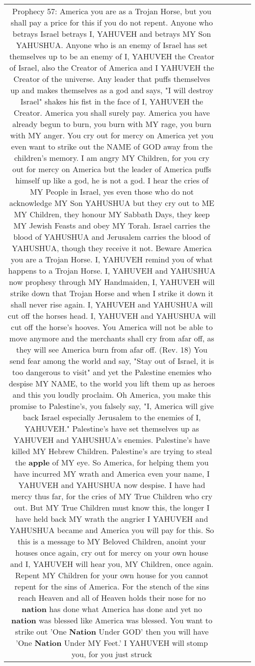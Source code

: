 \documentclass[11pt]{article}
\newlength\mylength
\begin{document}
\begin{center}
\begin{longtable}{|C{.65\mylength}|C{.30\mylength}|C{.12\mylength}|C{.12\mylength}|C{.12\mylength}|}
  \small Prophecy 57: America you are as a Trojan Horse, but you shall pay a price for this if you do not repent. Anyone who betrays Israel betrays I, YAHUVEH and betrays MY Son YAHUSHUA. Anyone who is an enemy of Israel has set themselves up to be an enemy of I, YAHUVEH the Creator of Israel, also the Creator of America and I YAHUVEH the Creator of the universe.  Any leader that puffs themselves up and makes themselves as a god and says, "I will destroy Israel" shakes his fist in the face of I, YAHUVEH the Creator. America you shall surely pay. America you have already begun to burn, you burn with MY rage, you burn with MY anger. You cry out for mercy on America yet you even want to strike out the NAME of GOD away from the children's memory. I am angry MY Children, for you cry out for mercy on America but the leader of America puffs himself up like a god, he is not a god. I hear the cries of MY People in Israel, yes even those who do not acknowledge MY Son YAHUSHUA but they cry out to ME MY Children, they honour MY Sabbath Days, they keep MY Jewish Feasts and obey MY Torah. Israel carries the blood of YAHUSHUA and Jerusalem carries the blood of YAHUSHUA, though they receive it not. Beware America you are a Trojan Horse. I, YAHUVEH remind you of what happens to a Trojan Horse. I, YAHUVEH and YAHUSHUA now prophesy through MY Handmaiden, I, YAHUVEH will strike down that Trojan Horse and when I strike it down it shall never rise again. I, YAHUVEH and YAHUSHUA will cut off the horses head. I, YAHUVEH and YAHUSHUA will cut off the horse's hooves. You America will not be able to move anymore and the merchants shall cry from afar off, as they will see America burn from afar off. (Rev. 18) You send fear among the world and say, "Stay out of Israel, it is too dangerous to visit" and yet the Palestine enemies who despise MY NAME, to the world you lift them up as heroes and this you loudly proclaim. Oh America, you make this promise to Palestine's, you falsely say, "I, America will give back Israel especially Jerusalem to the enemies of I, YAHUVEH." Palestine's have set themselves up as YAHUVEH and YAHUSHUA's enemies. Palestine's have killed MY Hebrew Children. Palestine's are trying to steal the \textbf{apple} of MY eye. So America, for helping them you have incurred MY wrath and America even your name, I YAHUVEH and YAHUSHUA now despise. I have had mercy thus far, for the cries of MY True Children who cry out. But MY True Children must know this, the longer I have held back MY wrath the angrier I YAHUVEH and YAHUSHUA became and America you will pay for this. So this is a message to MY Beloved Children, anoint your houses once again, cry out for mercy on your own house and I, YAHUVEH will hear you, MY Children, once again. Repent MY Children for your own house for you cannot repent for the sins of America. For the stench of the sins reach Heaven and all of Heaven holds their nose for no \textbf{nation} has done what America has done and yet no \textbf{nation} was blessed like America was blessed. You want to strike out 'One \textbf{Nation} Under GOD' then you will have 'One \textbf{Nation} Under MY Feet.' I YAHUVEH will stomp you, for you just struck 
\end{longtable}
\end{center}
\end{document}
